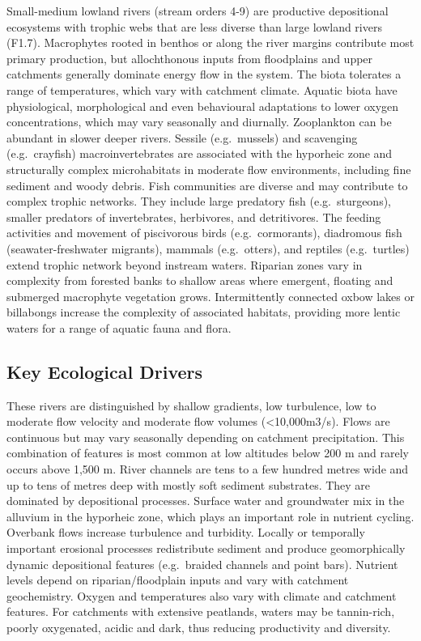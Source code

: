 \documentclass[
  letterpaper,
  DIV=11,
  numbers=noendperiod]{scrartcl}
\begin{document}
Small-medium lowland rivers (stream orders 4-9) are productive
depositional ecosystems with trophic webs that are less diverse than
large lowland rivers (F1.7). Macrophytes rooted in benthos or along the
river margins contribute most primary production, but allochthonous
inputs from floodplains and upper catchments generally dominate energy
flow in the system. The biota tolerates a range of temperatures, which
vary with catchment climate. Aquatic biota have physiological,
morphological and even behavioural adaptations to lower oxygen
concentrations, which may vary seasonally and diurnally. Zooplankton can
be abundant in slower deeper rivers. Sessile (e.g.~mussels) and
scavenging (e.g.~crayfish) macroinvertebrates are associated with the
hyporheic zone and structurally complex microhabitats in moderate flow
environments, including fine sediment and woody debris. Fish communities
are diverse and may contribute to complex trophic networks. They include
large predatory fish (e.g.~sturgeons), smaller predators of
invertebrates, herbivores, and detritivores. The feeding activities and
movement of piscivorous birds (e.g.~cormorants), diadromous fish
(seawater-freshwater migrants), mammals (e.g.~otters), and reptiles
(e.g.~turtles) extend trophic network beyond instream waters. Riparian
zones vary in complexity from forested banks to shallow areas where
emergent, floating and submerged macrophyte vegetation grows.
Intermittently connected oxbow lakes or billabongs increase the
complexity of associated habitats, providing more lentic waters for a
range of aquatic fauna and flora.

\subsection{Key Ecological Drivers}\label{key-ecological-drivers-110}

These rivers are distinguished by shallow gradients, low turbulence, low
to moderate flow velocity and moderate flow volumes
(\textless10,000m3/s). Flows are continuous but may vary seasonally
depending on catchment precipitation. This combination of features is
most common at low altitudes below 200 m and rarely occurs above 1,500
m. River channels are tens to a few hundred metres wide and up to tens
of metres deep with mostly soft sediment substrates. They are dominated
by depositional processes. Surface water and groundwater mix in the
alluvium in the hyporheic zone, which plays an important role in
nutrient cycling. Overbank flows increase turbulence and turbidity.
Locally or temporally important erosional processes redistribute
sediment and produce geomorphically dynamic depositional features
(e.g.~braided channels and point bars). Nutrient levels depend on
riparian/floodplain inputs and vary with catchment geochemistry. Oxygen
and temperatures also vary with climate and catchment features. For
catchments with extensive peatlands, waters may be tannin-rich, poorly
oxygenated, acidic and dark, thus reducing productivity and diversity.
\end{document}
